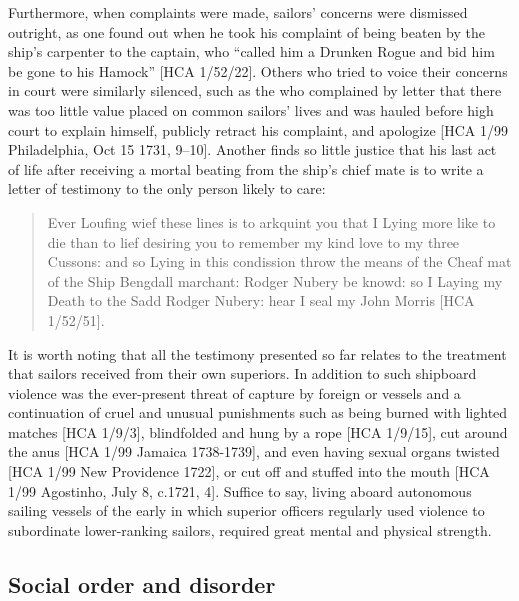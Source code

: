 Furthermore, when complaints were made, sailors’ concerns were dismissed outright, as one  found out when he took his complaint of being beaten by the ship’s carpenter to the captain, who “called him a Drunken Rogue and bid him be gone to his Hamock” [HCA 1/52/22]. Others who tried to voice their concerns in court were similarly silenced, such as the  who complained by letter that there was too little value placed on common sailors’ lives and was hauled before high court to explain himself, publicly retract his complaint, and apologize [HCA 1/99 Philadelphia, Oct 15 1731, 9--10]. Another  finds so little justice that his last act of life after receiving a mortal beating from the ship’s chief mate is to write a letter of testimony to the only person likely to care:

\begin{quotation}
Ever Loufing wief these lines is to arkquint you that I Lying more like to die than to lief desiring you to remember my kind love to my three Cussons: and so Lying in this condission throw the means of the Cheaf mat of the Ship Bengdall marchant: Rodger Nubery be knowd: so I Laying my Death to the Sadd Rodger Nubery: hear I seal my John Morris [HCA 1/52/51]. \end{quotation}

It is worth noting that all the testimony presented so far relates to the treatment that sailors received from their own superiors. In addition to such shipboard violence was the ever-present threat of capture by foreign or  vessels and a continuation of cruel and unusual punishments such as being burned with lighted matches [HCA 1/9/3], blindfolded and hung by a rope [HCA 1/9/15], cut around the anus [HCA 1/99 Jamaica {1738}-1739], and even having sexual organs twisted [HCA 1/99 New  Providence 1722], or cut off and stuffed into the mouth [HCA 1/99 Agostinho, July 8, c.1721, 4]. Suffice to say, living aboard autonomous sailing vessels of the early  in which superior officers regularly used violence to subordinate lower-ranking sailors, required great mental and physical strength.

\subsection{{Social order and disorder}}\label{sec:4.2.3}


